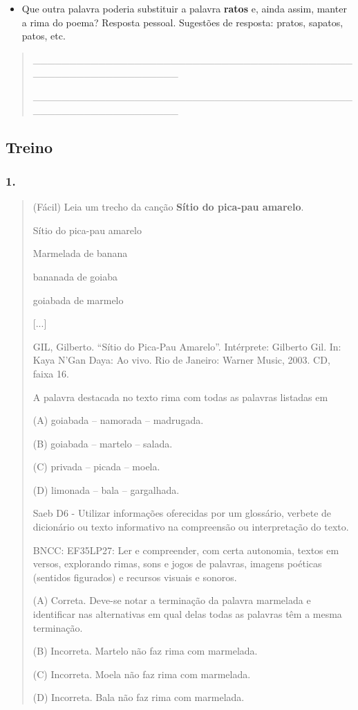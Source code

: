 \begin{itemize}
\item
  Que outra palavra poderia substituir a palavra \textbf{ratos} e, ainda
  assim, manter a rima do poema? Resposta pessoal. Sugestões de
  resposta: pratos, sapatos, patos, etc.
\end{itemize}

\begin{quote}
\_\_\_\_\_\_\_\_\_\_\_\_\_\_\_\_\_\_\_\_\_\_\_\_\_\_\_\_\_\_\_\_\_\_\_\_\_\_\_\_\_\_\_\_\_\_\_\_\_\_\_\_\_\_\_\_\_\_\_\_\_\_\_\_

\_\_\_\_\_\_\_\_\_\_\_\_\_\_\_\_\_\_\_\_\_\_\_\_\_\_\_\_\_\_\_\_\_\_\_\_\_\_\_\_\_\_\_\_\_\_\_\_\_\_\_\_\_\_\_\_\_\_\_\_\_\_\_\_
\end{quote}

\subsection{Treino}\label{treino-4}

\subsubsection{1. }\label{section-52}

\begin{quote}
(Fácil) Leia um trecho da canção \textbf{Sítio do pica-pau amarelo}.

Sítio do pica-pau amarelo

Marmelada de banana

bananada de goiaba

goiabada de marmelo

{[}...{]}

GIL, Gilberto. ``Sítio do Pica-Pau Amarelo''. Intérprete: Gilberto Gil.
In: Kaya N'Gan Daya: Ao vivo. Rio de Janeiro: Warner Music, 2003. CD,
faixa 16.

A palavra destacada no texto rima com todas as palavras listadas em

(A) goiabada -- namorada -- madrugada.

(B) goiabada -- martelo -- salada.

(C) privada -- picada -- moela.

(D) limonada -- bala -- gargalhada.

Saeb D6 - Utilizar informações oferecidas por um glossário, verbete de
dicionário ou texto informativo na compreensão ou interpretação do
texto.

BNCC: EF35LP27: Ler e compreender, com certa autonomia, textos em
versos, explorando rimas, sons e jogos de palavras, imagens poéticas
(sentidos figurados) e recursos visuais e sonoros.

(A) Correta. Deve-se notar a terminação da palavra marmelada e
identificar nas alternativas em qual delas todas as palavras têm a mesma
terminação.

(B) Incorreta. Martelo não faz rima com marmelada.

(C) Incorreta. Moela não faz rima com marmelada.

(D) Incorreta. Bala não faz rima com marmelada.
\end{quote}

